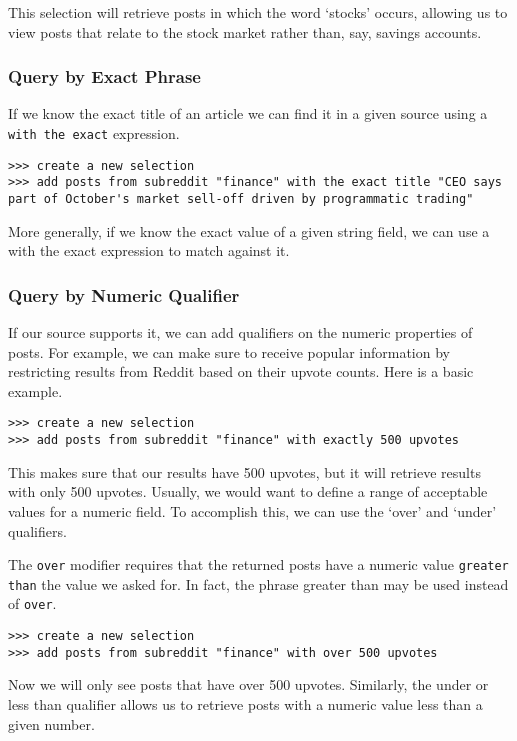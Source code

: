 This selection will retrieve posts in which the word ‘stocks’ occurs, allowing us to view posts that relate to the stock market rather than, say, savings accounts.


\subsubsection{Query by Exact Phrase}
If we know the exact title of an article we can find it in a given source using a \texttt{with the exact} expression.
\begin{lstlisting}
>>> create a new selection
>>> add posts from subreddit "finance" with the exact title "CEO says part of October's market sell-off driven by programmatic trading"
\end{lstlisting}

More generally, if we know the exact value of a given string field, we can use a with the exact expression to match against it.



\subsubsection{Query by Numeric Qualifier}
If our source supports it, we can add qualifiers on the numeric properties of posts. For example, we can make sure to receive popular information by restricting results from Reddit based on their upvote counts. Here is a basic example.
\begin{lstlisting}
>>> create a new selection
>>> add posts from subreddit "finance" with exactly 500 upvotes
\end{lstlisting}
This makes sure that our results have 500 upvotes, but it will retrieve results with only 500 upvotes. Usually, we would want to define a range of acceptable values for a numeric field. To accomplish this, we can use the ‘over’ and ‘under’ qualifiers.

The \texttt{over} modifier requires that the returned posts have a numeric value \texttt{greater than} the value we asked for. In fact, the phrase greater than may be used instead of \texttt{over}.
\begin{lstlisting}
>>> create a new selection
>>> add posts from subreddit "finance" with over 500 upvotes
\end{lstlisting}
Now we will only see posts that have over 500 upvotes. Similarly, the under or less than qualifier allows us to retrieve posts with a numeric value less than a given number.

